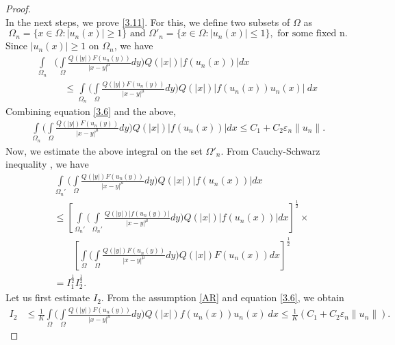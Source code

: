 \documentclass[11pt]{amsart}
\numberwithin{equation}{section}
\newcommand{\1}{\frac{1}{2}}
\begin{document}
\begin{proof}
\begin{equation}
		\end{equation}
		In the next steps, we prove \eqref{3.11}. For this, we define two subsets of $\Omega$ as
		\[  \Omega_n = \{ x\in \Omega: |u_n(x)| \geq 1\} \text{ and } \Omega'_n = \{ x\in \Omega: |u_n(x)| \leq 1\}, \text{ for some fixed n}.\]
		Since $|u_n(x)| \geq 1$ on $\Omega_n$, we have
		\begin{align}
			\int\limits_{\Omega_n} &\Bigg( \int\limits_\Omega  \frac{Q(|y|)F(u_n(y))}{|x-y|^\mu}dy\Bigg) Q(|x|)\left| f(u_n(x))\right| dx \nonumber\\
			&\quad \leq \int\limits_{\Omega_n}\Bigg( \int\limits_\Omega \frac{Q(|y|)F(u_n(y))}{|x-y|^\mu}dy\Bigg) Q(|x|)\left| f(u_n(x))u_n(x)\right|\ dx\nonumber
		\end{align}
		Combining equation \eqref{3.6} and the above, 
		\begin{align}
			\int\limits_{\Omega_n} \Bigg( \int\limits_\Omega  \frac{Q(|y|)F(u_n(y))}{|x-y|^\mu}dy\Bigg) Q(|x|)\left| f(u_n(x))\right| dx \leq C_1 +C_2 \varepsilon_n \|u_n\|. \label{4.1}
		\end{align}
		Now, we estimate the above integral on the set $\Omega'_n$. From Cauchy-Schwarz inequality \cite{Cauchy}, we have
		\begin{align}
			&\int\limits_{\Omega_n'} \Bigg( \int\limits_\Omega \frac{Q(|y|)F(u_n(y))}{|x-y|^\mu}dy\Bigg) Q(|x|)\left| f(u_n(x))\right| dx \nonumber\\
			&  \leq \left[ \int\limits_{\Omega_n'} \Bigg( \int\limits_{\Omega_n'} \frac{Q(|y|)|f(u_n(y))|}{|x-y|^\mu}dy\Bigg) Q(|x|)\left| f(u_n(x))\right| dx \right]^{\1}\times\nonumber\\
			& \quad \quad\left[\int\limits_{\Omega} \Bigg( \int\limits_\Omega \frac{Q(|y|)F(u_n(y))}{|x-y|^\mu}dy\Bigg) Q(|x|) F(u_n(x)) dx\right]^{\1} \nonumber\\
			&  = I_1^{\1} I_2^{\1}. \nonumber
		\end{align}
		Let us first estimate $I_2$. From the assumption \eqref{AR} and equation \eqref{3.6}, we obtain
		\begin{align}
			I_2 & \leq \frac{1}{K}\int\limits_{\Omega} \Bigg( \int\limits_\Omega \frac{Q(|y|)F(u_n(y))}{|x-y|^\mu}dy\Bigg) Q(|x|) f(u_n(x)) u_n(x)\ dx  \leq \frac{1}{K} (C_1+C_2 \varepsilon_n \|u_n\|). \nonumber
		\end{align}
		

\end{proof}
\end{document}
